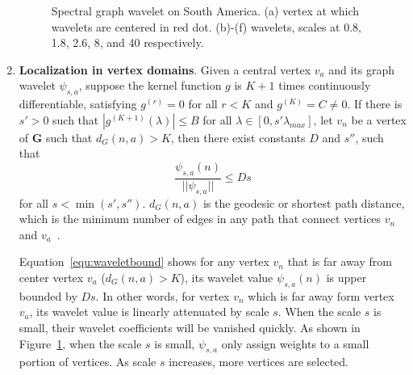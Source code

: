 \begin{enumerate}
\begin{figure}[t]
{		\label{fig:brazil5}
	}
	\caption{Spectral graph wavelet on South America. (a) vertex at which wavelets are centered in red dot. (b)-(f) wavelets, scales at 0.8, 1.8, 2.6, 8, and 40 respectively.}
	\label{fig:example2}
\end{figure}


\item \textbf{Localization in vertex domains}. Given a central vertex $v_a$ and its graph wavelet $\psi_{s,a}$, suppose the kernel function $g$ is $K+1$ times continuously differentiable, satisfying $g^{(r)}=0$ for all $r<K$ and $g^{(K)}=C\neq 0$. If there is $s'>0$ such that $|g^{(K+1)}(\lambda)|\leq B$ for all $\lambda \in [0, s'\lambda_{max}]$, let $v_n$ be a vertex of $\mathbf{G}$ such that $d_G(n,a)>K$, then there exist constants $D$ and $s''$, such that
\begin{equation}
\label{equ:waveletbound}
\frac{\psi_{s,a}(n)}{||\psi_{s,a}||}\leq Ds
\end{equation} for all $s<\min(s',s'')$.
$d_G(n,a)$ is the geodesic or shortest path distance, which is the minimum number of edges in any path that connect vertices $v_n$ and $v_a$~\cite{hammond2011wavelets}. 


Equation~\ref{equ:waveletbound} shows for any vertex $v_n$ that is far away from center vertex $v_a$ ($d_G(n,a)>K$), its wavelet value $\psi_{s,a}(n)$ is upper bounded by $Ds$. In other words, for vertex $v_n$ which is far away form vertex $v_a$, its wavelet value is linearly attenuated by scale $s$. When the scale $s$ is small, their wavelet coefficients will be vanished quickly. As shown in Figure~\ref{fig:example2}, when the scale $s$ is small, $\psi_{s,a}$ only assign weights to a small portion of vertices. As scale $s$ increases, more vertices are selected.

\end{enumerate}

